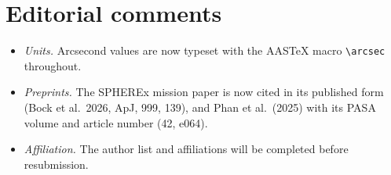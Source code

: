 \documentclass[11pt]{article}
\begin{document}
\section*{Editorial comments}
\begin{itemize}
\item \emph{Units.} Arcsecond values are now typeset with the AASTeX macro \texttt{\textbackslash arcsec} throughout.
\item \emph{Preprints.} The SPHEREx mission paper is now cited in its published form (Bock et al.\ 2026, ApJ, 999, 139), and Phan et al.\ (2025) with its PASA volume and article number (42, e064).
\item \emph{Affiliation.} The author list and affiliations will be completed before resubmission.
\end{itemize}
\end{document}
